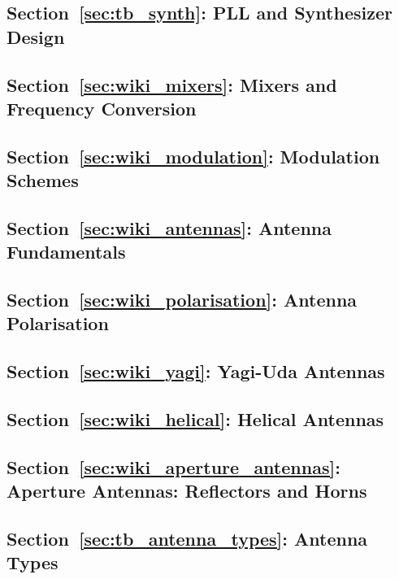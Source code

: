 
\subsection*{Section~\ref{sec:tb_synth}: PLL and Synthesizer Design}

\subsection*{Section~\ref{sec:wiki_mixers}: Mixers and Frequency Conversion}

\subsection*{Section~\ref{sec:wiki_modulation}: Modulation Schemes}

\subsection*{Section~\ref{sec:wiki_antennas}: Antenna Fundamentals}

\subsection*{Section~\ref{sec:wiki_polarisation}: Antenna Polarisation}

\subsection*{Section~\ref{sec:wiki_yagi}: Yagi-Uda Antennas}

\subsection*{Section~\ref{sec:wiki_helical}: Helical Antennas}

\subsection*{Section~\ref{sec:wiki_aperture_antennas}: Aperture Antennas: Reflectors and Horns}

\subsection*{Section~\ref{sec:tb_antenna_types}: Antenna Types}
